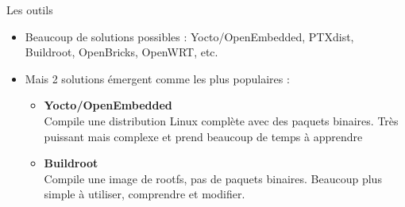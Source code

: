 \begin{frame}{Les outils}
  \begin{itemize}
  \item Beaucoup de solutions possibles : Yocto/OpenEmbedded, PTXdist,
    Buildroot, OpenBricks, OpenWRT, etc.
  \item Mais 2 solutions émergent comme les plus populaires :
    \begin{itemize}
    \item {\bf Yocto/OpenEmbedded}\\Compile une distribution Linux complète avec des paquets binaires. Très puissant mais complexe et prend beaucoup de temps à apprendre
    \item {\bf Buildroot}\\Compile une image de rootfs, pas de paquets binaires. Beaucoup plus simple à utiliser, comprendre et modifier.
    \end{itemize}
  \end{itemize}
\end{frame}
